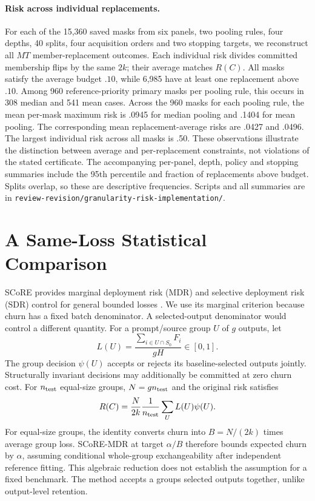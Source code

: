 \paragraph{Risk across individual replacements.}
For each of the 15,360 saved masks from six panels, two pooling rules, four depths, 40 splits, four acquisition orders and two stopping targets, we reconstruct all $MT$ member-replacement outcomes. Each individual risk divides committed membership flips by the same $2k$; their average matches $R(C)$. All masks satisfy the average budget $.10$, while 6,985 have at least one replacement above $.10$. Among 960 reference-priority primary masks per pooling rule, this occurs in 308 median and 541 mean cases. Across the 960 masks for each pooling rule, the mean per-mask maximum risk is .0945 for median pooling and .1404 for mean pooling. The corresponding mean replacement-average risks are .0427 and .0496. The largest individual risk across all masks is .50. These observations illustrate the distinction between average and per-replacement constraints, not violations of the stated certificate. The accompanying per-panel, depth, policy and stopping summaries include the 95th percentile and fraction of replacements above budget. Splits overlap, so these are descriptive frequencies. Scripts and all summaries are in \nolinkurl{review-revision/granularity-risk-implementation/}.


\section{A Same-Loss Statistical Comparison}
\label{app:review-score}
SCoRE provides marginal deployment risk (MDR) and selective deployment risk (SDR) control for general bounded losses \citep{bai2026score}. We use its marginal criterion because churn has a fixed batch denominator. A selected-output denominator would control a different quantity. For a prompt/source group $U$ of $g$ outputs, let
\[
 L(U)=\frac{\sum_{i\in U\cap S_0}F_i}{gH}\in[0,1].
\]
The group decision $\psi(U)$ accepts or rejects its baseline-selected outputs jointly. Structurally invariant decisions may additionally be committed at zero churn cost. For $n_{\rm test}$ equal-size groups, $N=g n_{\rm test}$ and the original risk satisfies
\[
 R(C)=\frac{N}{2k}\frac1{n_{\rm test}}\sum_U L(U)\psi(U).
\]
For equal-size groups, the identity converts churn into $B=N/(2k)$ times average group loss. SCoRE-MDR at target $\alpha/B$ therefore bounds expected churn by $\alpha$, assuming conditional whole-group exchangeability after independent reference fitting. This algebraic reduction does not establish the assumption for a fixed benchmark. The method accepts a group\textquotesingle s selected outputs together, unlike output-level retention.

